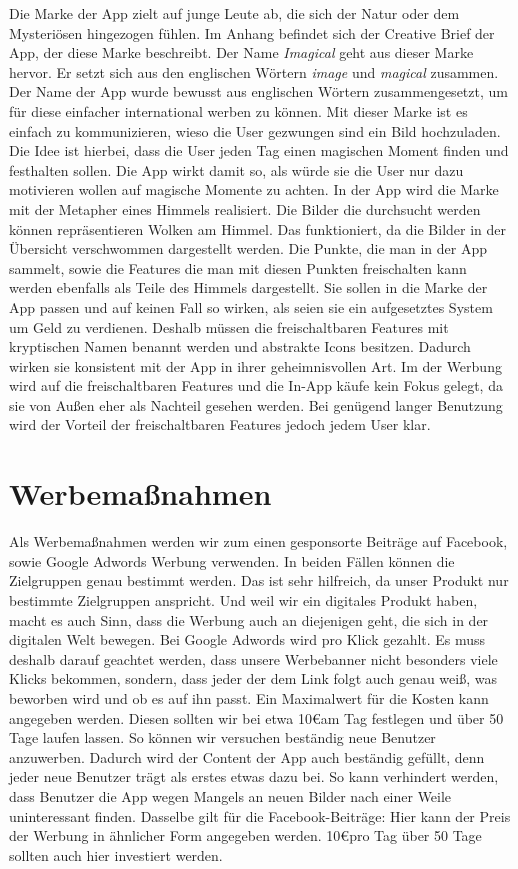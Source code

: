 Die Marke der App zielt auf junge Leute ab, die sich der Natur oder dem Mysteriösen hingezogen fühlen. Im Anhang befindet sich der Creative Brief der App, der diese Marke beschreibt.
Der Name \textit{Imagical} geht aus dieser Marke hervor. Er setzt sich aus den englischen Wörtern \textit{image} und \textit{magical} zusammen. Der Name der App wurde bewusst aus englischen Wörtern zusammengesetzt, um für diese einfacher international werben zu können.
Mit dieser Marke ist es einfach zu kommunizieren, wieso die User gezwungen sind ein Bild hochzuladen. Die Idee ist hierbei, dass die User jeden Tag einen magischen Moment finden und festhalten sollen. Die App wirkt damit so, als würde sie die User nur dazu motivieren wollen auf magische Momente zu achten.
In der App wird die Marke mit der Metapher eines Himmels realisiert. Die Bilder die durchsucht werden können repräsentieren Wolken am Himmel. Das funktioniert, da die Bilder in der Übersicht verschwommen dargestellt werden. Die Punkte, die man in der App sammelt, sowie die Features die man mit diesen Punkten freischalten kann werden ebenfalls als Teile des Himmels dargestellt. Sie sollen in die Marke der App passen und auf keinen Fall so wirken, als seien sie ein aufgesetztes System um Geld zu verdienen. Deshalb müssen die freischaltbaren Features mit kryptischen Namen benannt werden und abstrakte Icons besitzen. Dadurch wirken sie konsistent mit der App in ihrer geheimnisvollen Art.
Im der Werbung wird auf die freischaltbaren Features und die In-App käufe kein Fokus gelegt, da sie von Außen eher als Nachteil gesehen werden. Bei genügend langer Benutzung wird der Vorteil der freischaltbaren Features jedoch jedem User klar.

\section{Werbemaßnahmen}

Als Werbemaßnahmen werden wir zum einen gesponsorte Beiträge auf Facebook, sowie Google Adwords Werbung verwenden.
In beiden Fällen können die Zielgruppen genau bestimmt werden. Das ist sehr hilfreich, da unser Produkt nur bestimmte Zielgruppen anspricht. Und weil wir ein digitales Produkt haben, macht es auch Sinn, dass die Werbung auch an diejenigen geht, die sich in der digitalen Welt bewegen.
Bei Google Adwords wird pro Klick gezahlt. Es muss deshalb darauf geachtet werden, dass unsere Werbebanner nicht besonders viele Klicks bekommen, sondern, dass jeder der dem Link folgt auch genau weiß, was beworben wird und ob es auf ihn passt. Ein Maximalwert für die Kosten kann angegeben werden. Diesen sollten wir bei etwa 10\euro am Tag festlegen und über 50 Tage laufen lassen. So können wir versuchen beständig neue Benutzer anzuwerben. Dadurch wird der Content der App auch beständig gefüllt, denn jeder neue Benutzer trägt als erstes etwas dazu bei. So kann verhindert werden, dass Benutzer die App wegen Mangels an neuen Bilder nach einer Weile uninteressant finden.
Dasselbe gilt für die Facebook-Beiträge: Hier kann der Preis der Werbung in ähnlicher Form angegeben werden. 10\euro pro Tag über 50 Tage sollten auch hier investiert werden.

